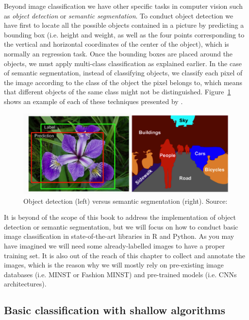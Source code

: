 Beyond image classification we have other specific tasks in computer vision such as \textit{object detection} or \textit{semantic segmentation}. To conduct object detection we have first to locate all the possible objects contained in a picture by predicting a bounding box (i.e. height and weight, as well as the four points corresponding to the vertical and horizontal coordinates of the center of the object), which is normally an regression task. Once the bounding boxes are placed around the objects, we must apply multi-class classification as explained earlier. In the case of semantic segmentation, instead of classifying objects, we classify each pixel of the image according to the class of the object the pixel belongs to, which means that different objects of the same class might not be distinguished. Figure~\ref{fig:location} shows an example of each of these techniques presented by \citet{geron2019hands}.

\begin{figure}
\centering
\includegraphics[width=0.9\linewidth]{figures/ch15_location.png}
\caption{Object detection (left) versus semantic segmentation (right).
Source: \citet{geron2019hands}}
\label{fig:location}
\end{figure}

It is beyond of the scope of this book to address the implementation of object detection or semantic segmentation, but we will focus on how to conduct basic image classification in state-of-the-art libraries in R and Python. As you may have imagined we will need some already-labelled images to have a proper training set. It is also out of the reach of this chapter to collect and annotate the images, which is the reason why we will mostly rely on pre-existing image databases (i.e. MINST or Fashion MINST) and pre-trained models (i.e. CNNs architectures). 

\subsection{Basic classification with shallow algorithms}
\label{subsec:shallow}


